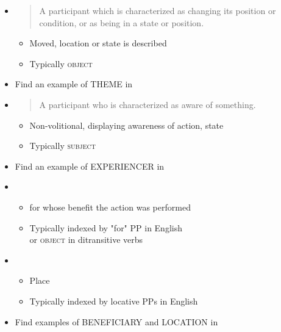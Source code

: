 \documentclass[a4paper,landscape,headrule,footrule,xetex]{foils}
\begin{document}
\begin{itemize}
\newpage
\item  {}
  \begin{quote}
     A participant which is characterized as changing its position or condition, or as
being in a state or position. 
  \end{quote}
  \begin{itemize}
  \item  Moved, location or state is described
  \item Typically \textsc{object}
\end{itemize}
\begin{exe}
  \ex {}
  \ex {}
  \ex {}
  \ex {}
  \ex *
\end{exe}
\item Find an example of THEME in \Story{}\task
\newpage

\item  {}
  \begin{quote}
    A participant who is characterized as aware of something.
  \end{quote}
  \begin{itemize}
  \item   Non-volitional, displaying awareness of action, state
  \item Typically \textsc{subject}
  \end{itemize}
  \begin{exe}
  \ex{}
  \ex{}
  \ex{}
\end{exe}
\item Find an example of EXPERIENCER in \Story{}\task
\newpage
\item  {}
  \begin{itemize}
  \item   for whose benefit the action was performed
  \item   Typically indexed by "for" PP in English
    \\ or \textsc{object} in ditransitive verbs
  \end{itemize}
  \begin{exe}
  \ex{}
  \ex{}
\end{exe}

\item  {}
  \begin{itemize}
  \item  Place
  \item Typically indexed by locative PPs in English
  \end{itemize}
  \begin{exe}
  \ex{}
  \ex{}
\end{exe}
\item Find  examples of BENEFICIARY and LOCATION in \Story{}\task
\newpage  


\end{itemize}
\end{document}
